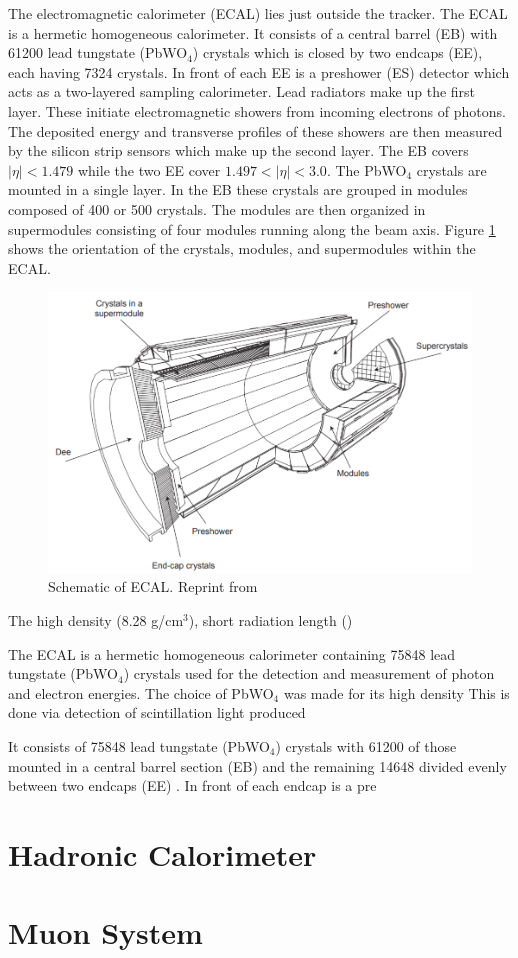 The electromagnetic calorimeter (ECAL) lies just outside the tracker.  The ECAL is a hermetic homogeneous calorimeter.  It consists of a central barrel (EB) with 61200 lead tungstate (PbWO$_{4}$) crystals which is closed by two endcaps (EE), each having 7324 crystals.  In front of each EE is a preshower (ES) detector which acts as a two-layered sampling calorimeter.  Lead radiators make up the first layer.  These initiate electromagnetic showers from incoming electrons of photons.  The deposited energy and transverse profiles of these showers are then measured by the silicon strip sensors which make up the second layer.  The EB covers $|\eta|<1.479$ while the two EE cover $1.497<|\eta|<3.0$.  The PbWO$_{4}$ crystals are mounted in a single layer.  In the EB these crystals are grouped in modules composed of 400 or 500 crystals.  The modules are then organized in supermodules consisting of four modules running along the beam axis.  Figure \ref{fig:ecallayout} shows the orientation of the crystals, modules, and supermodules within the ECAL.
 
 \begin{figure}[h]
 	\centering
 	\includegraphics[width=0.7\linewidth]{Figures/ECAL_layout}
 	\caption{Schematic of ECAL. Reprint from \cite{Collaboration_2008}}
 	\label{fig:ecallayout}
 \end{figure}
 
 
The high density (8.28 g/cm$^{3}$), short radiation length ()

The ECAL is a hermetic homogeneous calorimeter containing 75848 lead tungstate (PbWO$_{4}$) crystals used for the detection and measurement of photon and electron energies.  The choice of PbWO$_{4}$ was made for its high density 
This is done via detection of scintillation light produced


It consists of 75848 lead tungstate (PbWO$_{4}$) crystals with 61200 of those mounted in a central barrel section (EB) and the remaining 14648 divided evenly between two endcaps (EE) \cite{Collaboration_2008}.  In front of each endcap is a pre


\section{Hadronic Calorimeter}

\section{Muon System}

